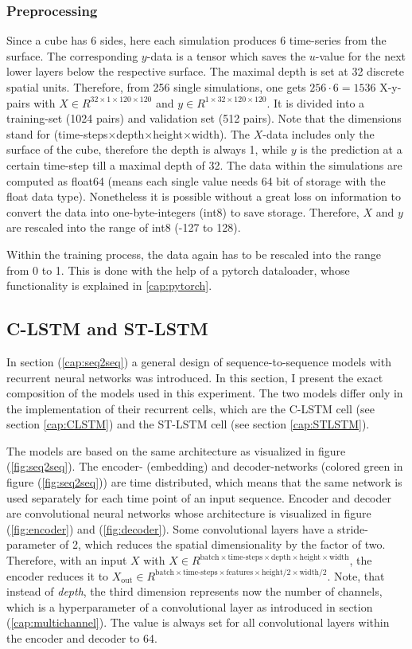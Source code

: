 \subsubsection{Preprocessing}
Since a cube has 6 sides, here each simulation produces 6 time-series from the surface. The corresponding $y$-data is a tensor which saves the $u$-value for the next lower layers below the respective surface. The maximal depth is set at 32 discrete spatial units. Therefore, from 256 single simulations, one gets $256\cdot6=1536$ X-y-pairs with $X\in R^{32\times1\times120\times120}$ and $y\in R^{1\times32\times120\times120}$. It is divided into a training-set (1024 pairs) and validation set (512 pairs). Note that the dimensions stand for (time-steps$\times$depth$\times$height$\times$width). The $X$-data includes only the surface of the cube, therefore the depth is always 1, while $y$ is the prediction at a certain time-step till a maximal depth of 32.
The data within the simulations are computed as float64 (means each single value needs 64 bit of storage with the float data type). Nonetheless it is possible without a great loss on information to convert the data into one-byte-integers (int8) to save storage. Therefore, $X$ and $y$ are rescaled into the range of int8 (-127 to 128). 

Within the training process, the data again has to be rescaled into the range from 0 to 1. This is done with the help of a pytorch dataloader, whose functionality is explained in \ref{cap:pytorch}.

\subsection{C-LSTM and ST-LSTM}
In section (\ref{cap:seq2seq}) a general design of sequence-to-sequence models with recurrent neural networks was introduced. In this section, I present the exact composition of the models used in this experiment. The two models differ only in the implementation of their recurrent cells, which are the C-LSTM cell (see section \ref{cap:CLSTM}) and the ST-LSTM cell (see section \ref{cap:STLSTM}).

The models are based on the same architecture as visualized in figure (\ref{fig:seq2seq}). The encoder- (embedding) and decoder-networks (colored green in figure (\ref{fig:seq2seq})) are time distributed, which means that the same network is used separately for each time point of an input sequence. Encoder and decoder are convolutional neural networks whose architecture is visualized in figure (\ref{fig:encoder}) and (\ref{fig:decoder}). Some convolutional layers have a stride-parameter of 2, which reduces the spatial dimensionality by the factor of two. Therefore, with an input $X$ with $X\in R^{\text{batch}\times\text{time-steps}\times\text{depth}\times\text{height}\times\text{width}}$, the encoder reduces it to $X_{\text{out}}\in R^{\text{batch}\times\text{time-steps}\times\text{features}\times\text{height/2}\times\text{width/2}}$. Note, that instead of \textit{depth}, the third dimension represents now the number of channels, which is a hyperparameter of a convolutional layer as introduced in section (\ref{cap:multichannel}). The value is always set for all convolutional layers within the encoder and decoder to 64.

